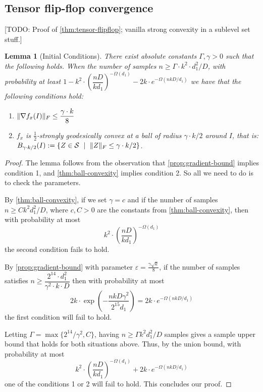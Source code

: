 \documentclass{article}
\newtheorem{lemma}[theorem]{Lemma}
\DeclarePairedDelimiter{\norm}{\lVert}{\rVert}
\newcommand\Sym{\mathcal{S}}
\newcommand\smallSym{S}
\newcommand{\TODO}[1]{{\color{blue}[TODO: #1]}}
\begin{document}
\subsection{Tensor flip-flop convergence}


\TODO{Proof of \cref{thm:tensor-flipflop}; vanilla strong convexity in a sublevel set stuff.}

\begin{lemma}[Initial Conditions]\label{lem:tensor-initial-conditions}
	There exist absolute constants $\Gamma, \gamma > 0$ such that the following holds.
	When the number of samples $n \geq \Gamma \cdot k^2 \cdot d_1^2/D$, with probability at least $1 - k^2 \cdot \left( \dfrac{nD}{k d_1} \right)^{-\Omega(d_1)} - 2k \cdot e^{- \Omega(nkD/d_1)}$ we have that the following conditions hold:
	\begin{enumerate}
		\item $\norm{\nabla f_x(I)}_F \leq \dfrac{\gamma \cdot k}{8}$ %
		\item $f_x$ is $\frac{1}{2}$-strongly geodesically convex at a ball of radius $\gamma \cdot k/2$ around $I$, that is: $B_{\gamma \cdot k/2}(I) := \{ Z \in \Sym \ \mid \ \norm{Z}_F \leq \gamma \cdot k/2 \}$.
	\end{enumerate}
\end{lemma}

\begin{proof}
	The lemma follows from the observation that \cref{prop:gradient-bound} implies condition 1, and \cref{thm:ball-convexity} implies condition 2. So all we need to do is to check the parameters.

	By \cref{thm:ball-convexity}, if we set $\gamma = c$ and if the number of samples $n \geq C k^2 d_1^2/D$, where $c, C > 0$ are the constants from \cref{thm:ball-convexity}, then with probability at most 
	$$k^2 \cdot \left( \dfrac{nD}{k d_1} \right)^{-\Omega(d_1)}$$
	the second condition fails to hold.
	
	By \cref{prop:gradient-bound} with parameter $\varepsilon = \frac{\gamma \sqrt{k}}{8}$, if the number of samples satisfies $n \geq \dfrac{2^{14} \cdot d_1^2}{\gamma^2 \cdot k \cdot D}$ then with probability at most 
	$$2 k \cdot \exp\left(- \frac{n k D \gamma^2}{2^{15} d_1}\right) = 2k \cdot e^{- \Omega(nkD/d_1)}$$
	the first condition will fail to hold.
	
	Letting $\Gamma = \max\{2^{14}/\gamma^2, C \}$, having $n \geq \Gamma k^2 d_1^2/D$ samples gives a sample upper bound that holds for both situations above.
	Thus, by the union bound, with probability at most 
	$$ k^2 \cdot \left( \dfrac{nD}{k d_1} \right)^{-\Omega(d_1)} + 2k \cdot e^{- \Omega(nkD/d_1)} $$
	one of the conditions 1 or 2 will fail to hold. This concludes our proof.
\end{proof}
\end{document}
